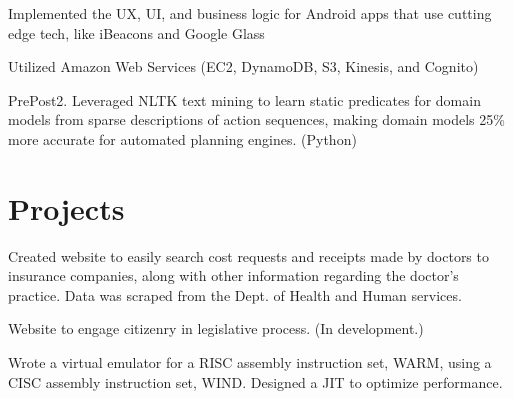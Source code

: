 \documentclass[]{deedy-resume-openfont}
\begin{document}
\begin{minipage}[t]{0.66\textwidth}
\begin{tightemize}
\item Implemented the UX, UI, and business logic for Android apps that use cutting edge tech, like iBeacons and Google Glass

\item Utilized Amazon Web Services (EC2, DynamoDB, S3, Kinesis, and Cognito)
\end{tightemize}
\sectionsep

\begin{tightemize}
\item PrePost2. Leveraged NLTK text mining to learn static predicates for domain models from sparse descriptions of action sequences, making domain models 25\% more accurate for automated planning engines. (Python)
\end{tightemize}
\sectionsep



\section{Projects}
\begin{tightemize}
\item Created website to easily search cost requests and receipts made by doctors to insurance companies, along with other information regarding the doctor's practice. Data was scraped from the Dept. of Health and Human services.
\end{tightemize}
\sectionsep

\begin{tightemize}
\item Website to engage citizenry in legislative process. (In development.)
\end{tightemize}
\sectionsep

\begin{tightemize}
\item Wrote a virtual emulator for a RISC assembly instruction set, WARM, using a CISC assembly instruction set, WIND. Designed a JIT to optimize performance.
\end{tightemize}
\sectionsep

\end{minipage} 
\end{document}
